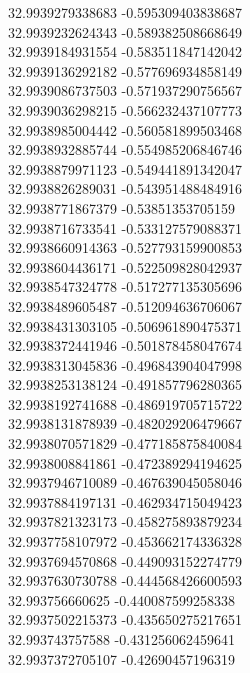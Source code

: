 {32.9939279338683	-0.595309403838687\\
32.9939232624343	-0.589382508668649\\
32.9939184931554	-0.583511847142042\\
32.9939136292182	-0.577696934858149\\
32.9939086737503	-0.571937290756567\\
32.9939036298215	-0.566232437107773\\
32.9938985004442	-0.560581899503468\\
32.9938932885744	-0.554985206846746\\
32.9938879971123	-0.549441891342047\\
32.9938826289031	-0.543951488484916\\
32.9938771867379	-0.53851353705159\\
32.9938716733541	-0.533127579088371\\
32.9938660914363	-0.527793159900853\\
32.9938604436171	-0.522509828042937\\
32.9938547324778	-0.517277135305696\\
32.9938489605487	-0.512094636706067\\
32.9938431303105	-0.506961890475371\\
32.9938372441946	-0.501878458047674\\
32.9938313045836	-0.496843904047998\\
32.9938253138124	-0.491857796280365\\
32.9938192741688	-0.486919705715722\\
32.9938131878939	-0.482029206479667\\
32.9938070571829	-0.477185875840084\\
32.9938008841861	-0.472389294194625\\
32.9937946710089	-0.467639045058046\\
32.9937884197131	-0.462934715049423\\
32.9937821323173	-0.458275893879234\\
32.9937758107972	-0.453662174336328\\
32.9937694570868	-0.449093152274779\\
32.9937630730788	-0.444568426600593\\
32.993756660625	-0.440087599258338\\
32.9937502215373	-0.435650275217651\\
32.993743757588	-0.431256062459641\\
32.9937372705107	-0.42690457196319\\
}
